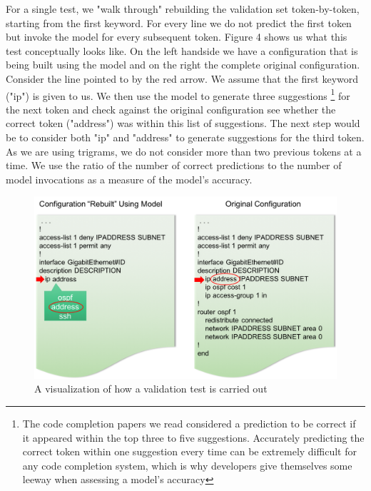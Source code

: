 For a single test, we "walk through" rebuilding the validation set token-by-token, starting from the first keyword. For every line we do not predict the first token but invoke the model for every subsequent token. Figure 4 shows us what this test conceptually looks like. On the left handside we have a configuration that is being built using the model and on the right the complete original configuration. Consider the line pointed to by the red arrow. We assume that the first keyword ("ip") is given to us. We then use the model to generate three suggestions
\footnote{The code completion papers we read considered a prediction to be correct if it appeared within the top three to five suggestions. Accurately predicting the correct token within one suggestion every time can be extremely difficult for any code completion system, which is why developers give themselves some leeway when assessing a model's accuracy}
for the next token and check against the original configuration see whether the correct token ("address") was within this list of suggestions. The next step would be to consider both "ip" and "address" to generate suggestions for the third token. As we are using trigrams, we do not consider more than two previous tokens at a time. We use the ratio of the number of correct predictions to the number of model invocations as a measure of the model's accuracy.\\

\begin{figure}[H]
	\centering
	\includegraphics[width=5in]{validation_example.png}
	\caption{A visualization of how a validation test is carried out}
\end{figure}


